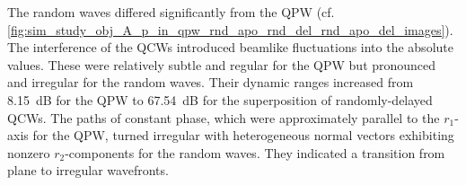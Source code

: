 The random waves differed significantly from
the \ac{QPW}
(cf. \cref{fig:sim_study_obj_A_p_in_qpw_rnd_apo_rnd_del_rnd_apo_del_images}).
The interference of
the \acp{QCW} introduced
beamlike fluctuations into
the absolute values.
These were
relatively subtle and
regular for
the \ac{QPW} but
pronounced and
irregular for
the random waves.
Their dynamic ranges increased from
\SI{8.15}{\deci\bel} for
the \ac{QPW} to
\SI{67.54}{\deci\bel} for
the superposition of
randomly-delayed \acp{QCW}.
The paths of
constant phase, which were
approximately parallel to
the $r_{1}$-axis for
the \ac{QPW}, turned
irregular with
heterogeneous normal vectors exhibiting
nonzero $r_{2}$-components for
the random waves.
They indicated
a transition from
plane to
irregular wavefronts.

